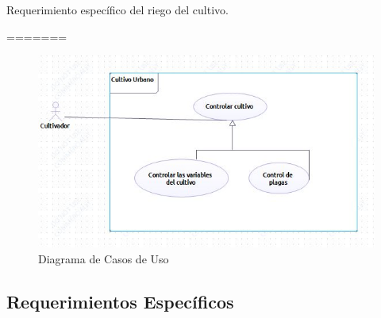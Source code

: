 \begin{table}[]
	\centering
	\caption{Requerimiento específico del riego del cultivo.}
=======
\begin{figure}[h!]
	\centering
	\includegraphics[width=0.7\linewidth]{proyecto/imgs/CasoDeUso}
	\caption{Diagrama de Casos de Uso}
	\label{fig:cronograma}
\end{figure}


\subsection{Requerimientos Específicos}


\end{table}
